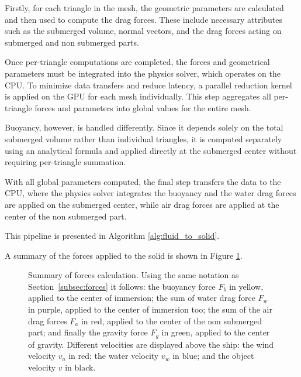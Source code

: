 \documentclass[final]{jcgt}
\begin{document}
Firstly, for each triangle in the mesh, the geometric parameters are calculated and then used to compute the drag forces. These include necessary attributes such as the submerged volume, normal vectors, and the drag forces acting on submerged and non submerged parts.

Once per-triangle computations are completed, the forces and geometrical parameters must be integrated into the physics solver, which operates on the CPU. To minimize data transfers and reduce latency, a parallel reduction kernel is applied on the GPU for each mesh individually. This step aggregates all per-triangle forces and parameters into global values for the entire mesh.

Buoyancy, however, is handled differently. Since it depends solely on the total submerged volume rather than individual triangles, it is computed separately using an analytical formula and applied directly at the submerged center without requiring per-triangle summation.

With all global parameters computed, the final step transfers the data to the CPU, where the physics solver integrates the buoyancy and the water drag forces are applied on the submerged center, while air drag forces are applied at the center of the non submerged part.

This pipeline is presented in Algorithm \ref{alg:fluid_to_solid}.



A summary of the forces applied to the solid is shown in Figure \ref{fig:forcesComputation}.

\begin{figure}[!h]
	\centering
	
	\caption{Summary of forces calculation. Using the same notation as Section~\ref{subsec:forces} it follows:
		the buoyancy force \textcolor{jauneC}{$F_b$} in \textcolor{jauneC}{yellow}, applied to the center of immersion;
		the sum of water drag force \textcolor{purpleF}{$F_w$} in \textcolor{purpleF}{purple}, applied to the center of immersion too;
		the sum of the air drag forces \textcolor{redF}{$F_a$} in \textcolor{redF}{red}, applied to the center of the non submerged part;
		and finally the gravity force \textcolor{greenF}{$F_g$} in \textcolor{greenF}{green}, applied to the center of gravity.
		Different velocities are displayed above the ship:
		the wind velocity \textcolor{redF}{$v_a$} in \textcolor{redF}{red};
		the water velocity \textcolor{bleuF}{$v_w$} in \textcolor{bleuF}{blue};
		and the object velocity \textcolor{noirC}{$v$} in \textcolor{noirC}{black}.}
	\label{fig:forcesComputation}
\end{figure}
\end{document}
